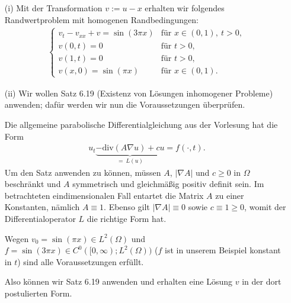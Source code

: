 \begin{solution}

\phantom{} \begin{itemize}
    \item[(i)] Mit der Transformation $v := u - x$ erhalten wir folgendes Randwertproblem mit homogenen Randbedingungen:
    \begin{align*}
        \begin{cases}
            v_t - v_{xx} + v = \sin(3\pi x) & \text{für~} x \in (0, 1),~ t > 0,\\
            v(0, t) = 0 & \text{für~} t > 0,\\
            v(1, t) = 0 & \text{für~} t > 0,\\
            v(x, 0) = \sin(\pi x) & \text{für~} x \in (0, 1).
        \end{cases}
    \end{align*}\label{rwp}

    \item[(ii)] Wir wollen Satz 6.19 (Existenz von Lösungen inhomogener Probleme) anwenden; dafür werden wir nun die Voraussetzungen überprüfen.

    Die allgemeine parabolische Differentialgleichung aus der Vorlesung hat die Form
    \begin{align*}
        u_t \underbrace{- \mathrm{div}(A \nabla u) + cu}_{=~ L(u)} = f(\cdot, t).
    \end{align*}
    Um den Satz anwenden zu können, müssen $A$, $|\nabla A|$ und $c \geq 0$ in $\Omega$ beschränkt und $A$ symmetrisch und gleichmäßig positiv definit sein.
    Im betrachteten eindimensionalen Fall entartet die Matrix $A$ zu einer Konstanten, nämlich $A \equiv 1.$ Ebenso gilt $|\nabla A| \equiv 0$ sowie $c \equiv 1 \geq 0$, womit der Differentialoperator $L$ die richtige Form hat.

    Wegen $v_0 = \sin(\pi x) \in L^2(\Omega)$ und $f = \sin(3\pi x) \in C^0([0, \infty); L^2(\Omega))$ ($f$ ist in unserem Beispiel konstant in $t$) sind alle Voraussetzungen erfüllt.

    Also können wir Satz 6.19 anwenden und erhalten eine Lösung $v$ in der dort postulierten Form.


\end{itemize}
\end{solution}

